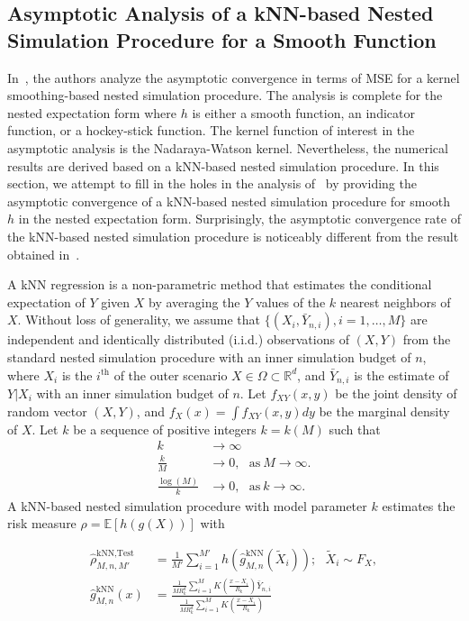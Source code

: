 \subsection{Asymptotic Analysis of a kNN-based Nested Simulation Procedure for a Smooth Function}

In~\cite{hong2017kernel}, the authors analyze the asymptotic convergence in terms of MSE for a kernel smoothing-based nested simulation procedure.
The analysis is complete for the nested expectation form where $h$ is either a smooth function, an indicator function, or a hockey-stick function.
The kernel function of interest in the asymptotic analysis is the Nadaraya-Watson kernel.
Nevertheless, the numerical results are derived based on a kNN-based nested simulation procedure.
In this section, we attempt to fill in the holes in the analysis of~\cite{hong2017kernel} by providing the asymptotic convergence of a kNN-based nested simulation procedure for smooth $h$ in the nested expectation form.
Surprisingly, the asymptotic convergence rate of the kNN-based nested simulation procedure is noticeably different from the result obtained in~\cite{hong2017kernel}.

A kNN regression is a non-parametric method that estimates the conditional expectation of $Y$ given $X$ by averaging the $Y$ values of the $k$ nearest neighbors of $X$.
Without loss of generality, we assume that $\{(X_i, \bar{Y}_{n, i}), i = 1, \dots, M\}$ are independent and identically distributed (i.i.d.) observations of $(X, Y)$ from the standard nested simulation procedure with an inner simulation budget of $n$, where $X_i$ is the $i^{\text{th}}$ of the outer scenario $X \in \Omega \subset \mathbb{R}^d$, and $\bar{Y}_{n, i}$ is the estimate of $Y|X_i$ with an inner simulation budget of $n$.
Let $f_{XY}(x, y)$ be the joint density of random vector $(X, Y)$, and $f_X(x) = \int f_{XY}(x, y) dy$ be the marginal density of $X$.
Let $k$ be a sequence of positive integers $k = k(M)$ such that 
\begin{align*}
    k                   & \rightarrow \infty \\
    \frac{k}{M}         & \rightarrow 0, ~~~ \text{as} ~ M \rightarrow \infty. \\
    \frac{\log(M)}{k}   & \rightarrow 0, ~~~ \text{as} ~ k \rightarrow \infty.
\end{align*}
A kNN-based nested simulation procedure with model parameter $k$ estimates the risk measure $\rho = \mathbb{E} \left[ h(g(X)) \right]$ with

\begin{align*}
\hat{\rho}^{\text{kNN}, \text{Test}}_{M, n, M'} 
& = \frac{1}{M'} \sum_{i=1}^{M'} h(\hat{g}^{\text{kNN}}_{M, n}(\tilde{X}_i)); ~~~ \tilde{X}_i \sim F_X, \\
\hat{g}^{\text{kNN}}_{M, n}(x) 
& = \frac{\frac{1}{M R_k^d} \sum_{i=1}^M K\left(\frac{x - X_i}{R_k}\right) \bar{Y}_{n, i}}{\frac{1}{M R_k^d} \sum_{i=1}^M K\left(\frac{x - X_i}{R_k}\right)}
\end{align*}

